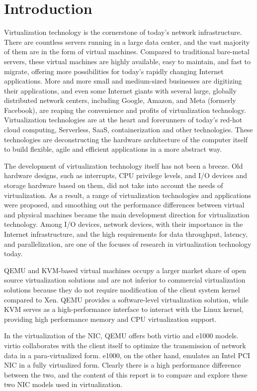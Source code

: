 \section{Introduction}


Virtualization technology is the cornerstone of today's network infrastructure. There are countless servers running in a large data center, and the vast majority of them are in the form of virtual machines. Compared to traditional bare-metal servers, these virtual machines are highly available, easy to maintain, and fast to migrate, offering more possibilities for today's rapidly changing Internet applications. More and more small and medium-sized businesses are digitizing their applications, and even some Internet giants with several large, globally distributed network centers, including Google, Amazon, and Meta (formerly Facebook), are reaping the convenience and profits of virtualization technology. Virtualization technologies are at the heart and forerunners of today's red-hot cloud computing, Serverless, SaaS, containerization and other technologies. These technologies are deconstructing the hardware architecture of the computer itself to build flexible, agile and efficient applications in a more abstract way.

The development of virtualization technology itself has not been a breeze. Old hardware designs, such as interrupts, CPU privilege levels, and I/O devices and storage hardware based on them, did not take into account the needs of virtualization. As a result, a range of virtualization technologies and applications were proposed, and smoothing out the performance differences between virtual and physical machines became the main development direction for virtualization technology. Among I/O devices, network devices, with their importance in the Internet infrastructure, and the high requirements for data throughput, latency, and parallelization, are one of the focuses of research in virtualization technology today.

QEMU and KVM-based virtual machines occupy a larger market share of open source virtualization solutions and are not inferior to commercial virtualization solutions because they do not require modification of the client system kernel compared to Xen. QEMU provides a software-level virtualization solution, while KVM serves as a high-performance interface to interact with the Linux kernel, providing high performance memory and CPU virtualization support.

In the virtualization of the NIC, QEMU offers both virtio and e1000 models. virtio collaborates with the client itself to optimize the transmission of network data in a para-virtualized form. e1000, on the other hand, emulates an Intel PCI NIC in a fully virtualized form. Clearly there is a high performance difference between the two, and the content of this report is to compare and explore these two NIC models used in virtualization.

